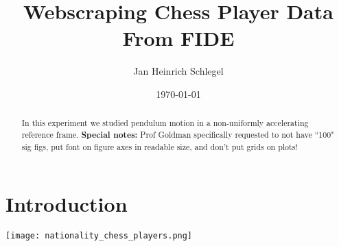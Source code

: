\documentclass[letterpaper,12pt]{article}
\begin{document}
\title{Webscraping Chess Player Data From FIDE}
\author{Jan Heinrich Schlegel}
\date{\today}
\maketitle

\begin{abstract}
In this experiment we studied pendulum motion in a non-uniformly accelerating reference frame. \textbf{Special notes:} Prof Goldman specifically requested to not have ``100" sig figs, put font on figure axes in readable size, and don't put grids on plots!
\end{abstract}


\section{Introduction}
\texttt{[image: nationality\_chess\_players.png]}
\end{document}
